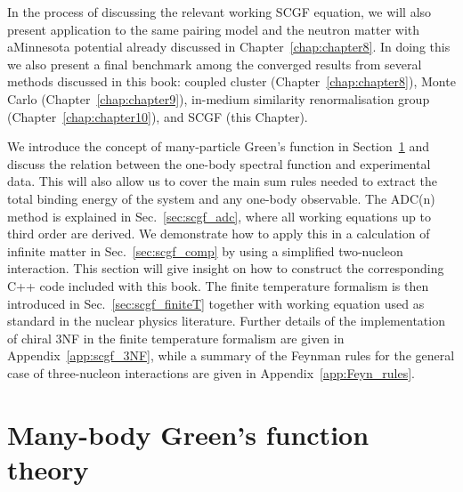 In the process of discussing the relevant working SCGF equation, we will also present application to the same pairing model and the neutron matter with aMinnesota potential already discussed in Chapter~\ref{chap:chapter8}. In doing this we also present a final benchmark among the converged results from several methods discussed in this book: coupled cluster (Chapter~\ref{chap:chapter8}),  Monte Carlo (Chapter~\ref{chap:chapter9}),  in-medium similarity renormalisation group (Chapter~\ref{chap:chapter10}),  and SCGF (this Chapter).

We introduce the concept of many-particle Green's function in Section~\ref{sec:scgf_defs} and discuss the relation between the one-body spectral function and experimental data. This will also allow us to cover the main sum rules needed to extract the total binding energy of the system and any one-body observable.
 The ADC(n) method is explained in Sec.~\ref{sec:scgf_adc}, where all working equations up to third order are derived.  We demonstrate how to apply this in a calculation of infinite matter in  Sec.~\ref{sec:scgf_comp} by using a simplified two-nucleon interaction. This section will give insight on how to construct the corresponding C++ code included with this book.
The finite temperature formalism is then introduced in Sec.~\ref{sec:scgf_finiteT} together with working equation used as standard in the nuclear physics literature.
%
Further details of the implementation of chiral 3NF in the finite temperature formalism are given in  Appendix~\ref{app:scgf_3NF}, while a summary of the Feynman rules for the general case of three-nucleon interactions are given in Appendix~\ref{app:Feyn_rules}.


\section{Many-body Green's function theory}
\label{sec:scgf_defs}


